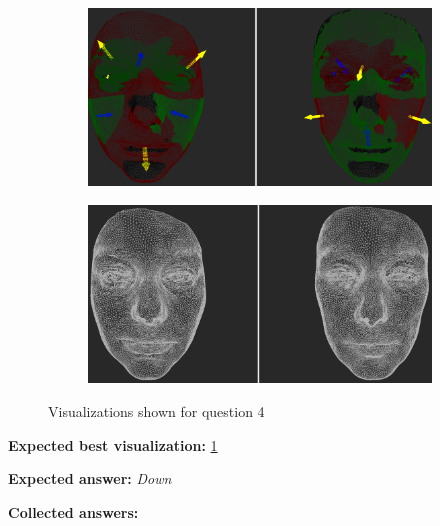 \begin{figure}[h]
\begin{subfigure}{0.49\textwidth}
\includegraphics[width=\textwidth]{./img-study/pair9.PNG}
\caption{}
\label{fig:study-3-9}
\end{subfigure}
\begin{subfigure}{0.49\textwidth}
\includegraphics[width=\textwidth]{./img-study/pair6.PNG}
\caption{}
\label{fig:study-3-6}
\end{subfigure}
\caption{Visualizations shown for question 4}
\end{figure}
\medskip

{\bf Expected best visualization:} \ref{fig:study-3-9}
\medskip

{\bf Expected answer:} {\it Down}
\medskip

{\bf Collected answers:}

